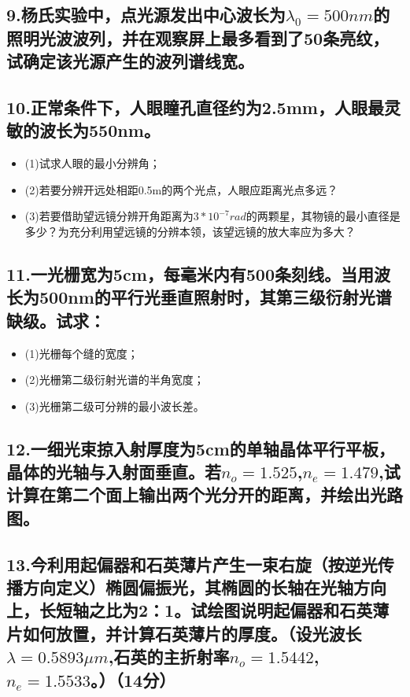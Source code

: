 \documentclass[11pt,a4paper]{article}
\begin{document}
    \subsection*{9.杨氏实验中，点光源发出中心波长为$\lambda_0=500nm$的照明光波波列，并在观察屏上最多看到了50条亮纹，试确定该光源产生的波列谱线宽。}
    \vspace{20mm}
    \subsection*{10.正常条件下，人眼瞳孔直径约为2.5mm，人眼最灵敏的波长为550nm。}
    \begin{itemize}
        \vspace{0mm}
        \item (1)试求人眼的最小分辨角；
        \vspace{0mm}
        \item (2)若要分辨开远处相距0.5m的两个光点，人眼应距离光点多远？
        \vspace{0mm}
        \item (3)若要借助望远镜分辨开角距离为$3*10^{-7}rad$的两颗星，其物镜的最小直径是多少？为充分利用望远镜的分辨本领，该望远镜的放大率应为多大？
    \end{itemize}
    \vspace{20mm}
    \subsection*{11.一光栅宽为5cm，每毫米内有500条刻线。当用波长为500nm的平行光垂直照射时，其第三级衍射光谱缺级。试求：}
    \begin{itemize}
        \vspace{0mm}
        \item (1)光栅每个缝的宽度；
        \vspace{0mm}
        \item (2)光栅第二级衍射光谱的半角宽度；
        \vspace{0mm}
        \item (3)光栅第二级可分辨的最小波长差。
    \end{itemize}
    \vspace{20mm}
    \subsection*{12.一细光束掠入射厚度为5cm的单轴晶体平行平板，晶体的光轴与入射面垂直。若$n_o=1.525$,$n_e=1.479$,试计算在第二个面上输出两个光分开的距离，并绘出光路图。}
    \vspace{20mm}
    \subsection*{13.今利用起偏器和石英薄片产生一束右旋（按逆光传播方向定义）椭圆偏振光，其椭圆的长轴在光轴方向上，长短轴之比为2：1。试绘图说明起偏器和石英薄片如何放置，并计算石英薄片的厚度。（设光波长$\lambda=0.5893\mu m$,石英的主折射率$n_o=1.5442$,$n_e=1.5533$。）（14分）}
    \vspace{20mm}
\end{document}
